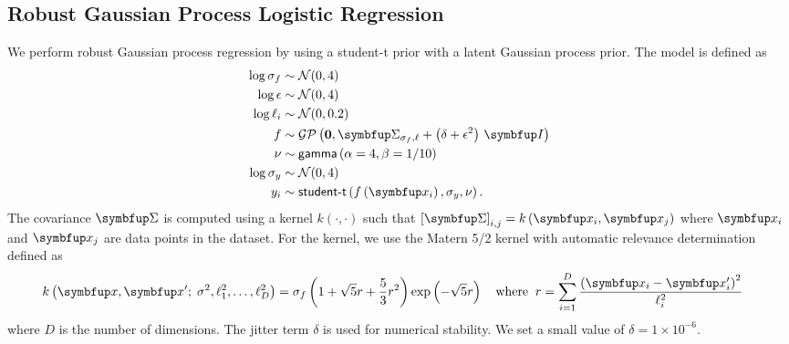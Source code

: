 \subsection{Robust Gaussian Process Logistic Regression}\label{section:model_rgp}
We perform robust Gaussian process regression by using a student-t prior with a latent Gaussian process prior.
The model is defined as
\begin{align*}
   \log \sigma_f &\sim \mathcal{N}(0, 4) \\
   \log \epsilon &\sim \mathcal{N}(0, 4) \\
   \log \ell_i   &\sim \mathcal{N}(0, 0.2) \\
   f   &\sim \mathcal{GP}\left(\mathbf{0}, \mSigma_{\sigma_f, \mathbf{\ell}} + \left(\delta + \epsilon^2\right)\,\mI \right) \\
   \nu &\sim \mathsf{gamma}\left(\alpha=4, \beta=1/10\right) \\
   \log \sigma_y &\sim \mathcal{N}(0, 4) \\
   y_i &\sim \mathsf{student\text{-}t}\left(  f\left( \vx_i \right), \sigma_y, \nu  \right).
\end{align*}
The covariance \(\mSigma\) is computed using a kernel \(k\left(\cdot, \cdot\right)\) such that \({[\mSigma]}_{i,j} = k\left( \vx_{i}, \vx_{j} \right) \) where \(\vx_i\) and \(\vx_j\) are data points in the dataset.
For the kernel, we use the Matern 5/2 kernel with automatic relevance determination~\citep{neal_bayesian_1996} defined as
\begin{align*}
  &k\left(\vx, \vx' ;\; \sigma^2, \ell^2_1, \ldots, \ell^2_D \right) =
  \sigma_f \left( 1 + \sqrt{5} r + \frac{5}{3} r^2 \right) \exp\left( - \sqrt{5} r \right) \quad
  \text{where}\;\; r = \sum^{D}_{i=1} \frac{ {\left(\vx_i - \vx'_i\right)}^2 }{\ell^2_i}
\end{align*}
where \(D\) is the number of dimensions.
The jitter term \(\delta\) is used for numerical stability.
We set a small value of \(\delta = 1\times10^{-6}\).

